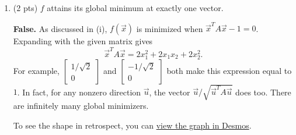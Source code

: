 \documentclass[11pt]{article}
\begin{document}
\begin{prob}[(18 pts)]
\begin{subprob}
\begin{enumerate}[label=(\roman*)]
\begin{solution}
\begin{itemize}
\item Since $f(\vec x)=(\vec x^TA\vec x-1)^2$ is a square and can equal zero, its minimum value is $0$. Every $\vec x$ satisfying $\vec x^TA\vec x=1$ is a global minimizer, and there are infinitely many such vectors. This also explains why (ii) is false.
\item When $\vec x=\vec 0$, the gradient is also zero, but $f(\vec 0)=1$. To classify this point, try a small step away from the origin, such as $\vec x=\begin{bmatrix}0\\0.1\end{bmatrix}$. Then $\vec x^TA\vec x=2(0.1)^2=0.02$, so $f(\vec x)=(0.02-1)^2=0.9604<1$. In fact, $\vec x^TA\vec x=x_1^2+x_2^2+(x_1+x_2)^2$ is positive for every nonzero $\vec x$ and tends to zero near the origin. Hence $0<\vec x^TA\vec x<1$ for every sufficiently small nonzero $\vec x$, and $f(\vec x)<f(\vec 0)$. The origin is a strict local maximum, which rules out convexity.
\end{itemize}

To see the contradiction directly, convexity would require
\[
f((1-t)\vec x+t\vec y)\leq (1-t)f(\vec x)+tf(\vec y)
\qquad\text{for every }t\in[0,1].
\]
Take a sufficiently small nonzero $\vec x$, set $\vec y=-\vec x$, and take $t=1/2$. The left side is $f(\vec 0)=1$, while the right side is the average of two values strictly below $1$.
\end{solution}
\item (2 pts) $f$ attains its global minimum at exactly one vector.
 

\begin{solution}
\textbf{False.} As discussed in (i), $f(\vec x)$ is minimized when $\vec x^TA\vec x-1=0$. Expanding with the given matrix gives
\[
\vec x^TA\vec x=2x_1^2+2x_1x_2+2x_2^2.
\]
For example, $\begin{bmatrix}1/\sqrt{2}\\0\end{bmatrix}$ and $\begin{bmatrix}-1/\sqrt{2}\\0\end{bmatrix}$ both make this expression equal to $1$. In fact, for any nonzero direction $\vec u$, the vector $\vec u/\sqrt{\vec u^TA\vec u}$ does too. There are infinitely many global minimizers.

To see the shape in retrospect, you can \href{https://www.desmos.com/3d/8uyka4tjla}{view the graph in Desmos}.


\end{solution}
\end{enumerate}
\end{subprob}
\end{prob}
\end{document}
